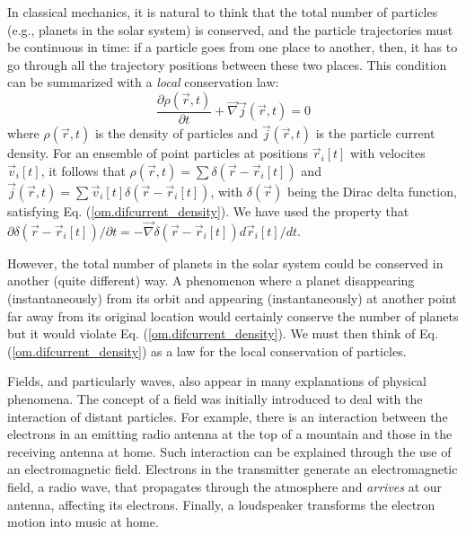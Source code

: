 \documentclass[nofootinbib, secnumarabic, amsmath, nobibnotes,10pt,aps,pra]{revtex4-1}
\newcommand{\eref}[1]{Eq. (\ref{#1})}
\begin{document}
In classical mechanics, it is natural to think that the total number
of particles (e.g., planets in the solar system) is conserved, and
the particle trajectories must be continuous in time: if a particle
goes from one place to another, then, it  has to go through all the trajectory
positions between these two places. This condition can be summarized
with a \textit{local} conservation law:
\begin{equation}
\label{om.difcurrent_density}
\frac{\partial\rho(\vec{r},t)}{\partial t} + \vec{\nabla} \vec{j}(\vec{r},t) = 0
\end{equation}
where $\rho(\vec{r},t)$ is the density of particles and
$\vec{j}(\vec{r},t)$ is the particle current density. For an
ensemble of point particles at positions $\vec{r}_i[t]$ with
velocites $\vec{v}_i[t]$, it follows that $\rho(\vec{r},t) =
\sum\delta(\vec{r}-\vec{r}_{i}[t])$ and $\vec{j}(\vec{r},t) =
\sum\vec{v}_{i}[t] \delta(\vec{r}-\vec{r}_{i}[t])$, with
$\delta(\vec{r})$ being the Dirac delta function, satisfying \eref{om.difcurrent_density}. We have used the property that ${\partial \delta(\vec{r}-\vec{r}_{i}[t])}/{\partial t}= -\vec{\nabla} \delta(\vec{r}-\vec{r}_{i}[t]) {d \vec{r}_{i}[t]}/{dt}$.

However, the total number of planets in the solar system could be conserved in another (quite different) way.
A phenomenon where a planet disappearing (instantaneously) from its orbit and appearing (instantaneously) at another point far away from its original location would certainly conserve the number of planets but it would violate \eref{om.difcurrent_density}. We must then think of \eref{om.difcurrent_density} as a law for the local conservation of particles.

Fields, and particularly waves, also appear in many explanations of
physical phenomena. The concept of a field was initially introduced
to deal with the interaction of distant particles.  For example,
there is an interaction between the electrons in an emitting radio
antenna at the top of a mountain and those in the receiving antenna
at home. Such interaction can be explained through the use of an
electromagnetic field. Electrons in the transmitter generate an
electromagnetic field, a radio wave, that propagates through the
atmosphere and \textit{arrives} at our antenna, affecting its
electrons. Finally, a loudspeaker transforms the electron motion
into music at home.
\end{document}
